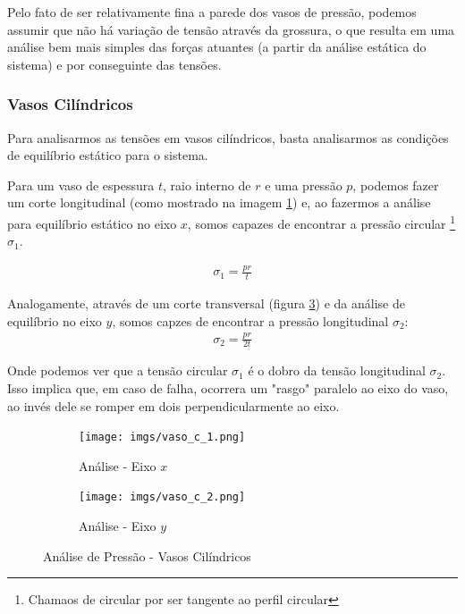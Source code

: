 \documentclass{article}
\begin{document}
Pelo fato de ser relativamente fina a parede dos vasos de pressão, podemos assumir que não há variação de tensão através da grossura, o que resulta em uma análise bem mais simples das forças atuantes (a partir da análise estática do sistema) e por conseguinte das tensões.

\subsubsection{Vasos Cilíndricos}
Para analisarmos as tensões em vasos cilíndricos, basta analisarmos as condições de equilíbrio estático para o sistema. 

Para um vaso de espessura $t$, raio interno de $r$ e uma pressão $p$, podemos fazer um corte longitudinal (como mostrado na imagem \ref{fig:vaso_c_eixo_x}) e, ao fazermos a análise para equilíbrio estático no eixo $x$, somos capazes de encontrar a pressão circular \footnote{Chamaos de circular por ser tangente ao perfil circular} $\sigma_1$.

\begin{align}
    \sigma_1 = \frac{pr}{t}
\end{align}

Analogamente, através de um corte transversal (figura \ref{fig:vaso_c_eixo_y}) e da análise de equilíbrio no eixo $y$, somos capzes de encontrar a pressão longitudinal $\sigma_2$:
\begin{align}
    \sigma_2 = \frac{pr}{2t}
\end{align}

Onde podemos ver que a tensão circular $\sigma_1$ é o dobro da tensão longitudinal $\sigma_2$. Isso implica que, em caso de falha, ocorrera um "rasgo" paralelo ao eixo do vaso, ao invés dele se romper em dois perpendicularmente ao eixo.
\begin{figure}[h]

    \centering
    \begin{subfigure}[t]{.45\textwidth}
        \centering
        \texttt{[image: imgs/vaso\_c\_1.png]}
        \caption{Análise - Eixo $x$}
        \label{fig:vaso_c_eixo_x}
    \end{subfigure}
    \begin{subfigure}[t]{0.45\textwidth}
        \centering
        \texttt{[image: imgs/vaso\_c\_2.png]}
        \caption{Análise - Eixo $y$}
        \label{fig:vaso_c_eixo_y}
    \end{subfigure}
    \caption{Análise de Pressão - Vasos Cilíndricos}
\end{figure}
\end{document}
